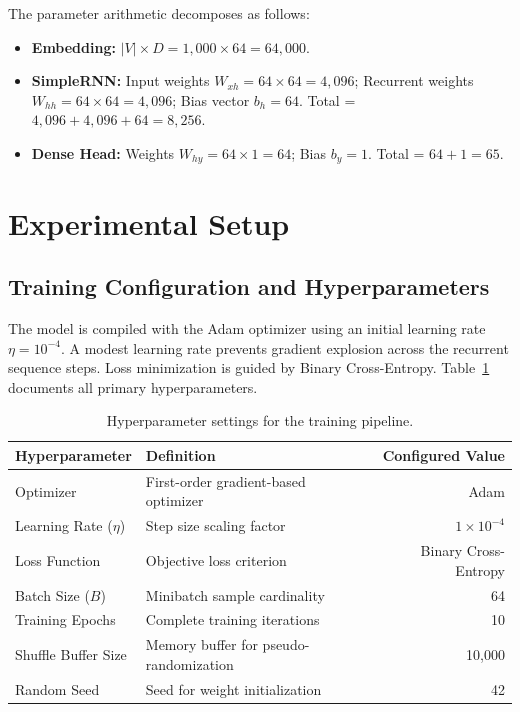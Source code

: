 \documentclass[11pt,a4paper]{article}
\begin{document}
The parameter arithmetic decomposes as follows:
\begin{itemize}
    \item \textbf{Embedding:} $|V| \times D = 1,000 \times 64 = 64,000$.
    \item \textbf{SimpleRNN:} Input weights $W_{xh} = 64 \times 64 = 4,096$; Recurrent weights $W_{hh} = 64 \times 64 = 4,096$; Bias vector $b_h = 64$. Total = $4,096 + 4,096 + 64 = 8,256$.
    \item \textbf{Dense Head:} Weights $W_{hy} = 64 \times 1 = 64$; Bias $b_y = 1$. Total = $64 + 1 = 65$.
\end{itemize}

\section{Experimental Setup}
\label{sec:setup}

\subsection{Training Configuration and Hyperparameters}
The model is compiled with the Adam optimizer using an initial learning rate $\eta = 10^{-4}$. A modest learning rate prevents gradient explosion across the recurrent sequence steps. Loss minimization is guided by Binary Cross-Entropy. Table~\ref{tab:hyperparams} documents all primary hyperparameters.

\begin{table}[H]
\centering
\begin{tabular}{llr}
\toprule
\textbf{Hyperparameter} & \textbf{Definition} & \textbf{Configured Value} \\
\midrule
Optimizer               & First-order gradient-based optimizer & Adam \\
Learning Rate ($\eta$)  & Step size scaling factor & $1 \times 10^{-4}$ \\
Loss Function           & Objective loss criterion & Binary Cross-Entropy \\
Batch Size ($B$)        & Minibatch sample cardinality & 64 \\
Training Epochs         & Complete training iterations & 10 \\
Shuffle Buffer Size     & Memory buffer for pseudo-randomization & 10,000 \\
Random Seed             & Seed for weight initialization & 42 \\
\bottomrule
\end{tabular}
\caption{Hyperparameter settings for the training pipeline.}
\label{tab:hyperparams}
\end{table}
\end{document}

